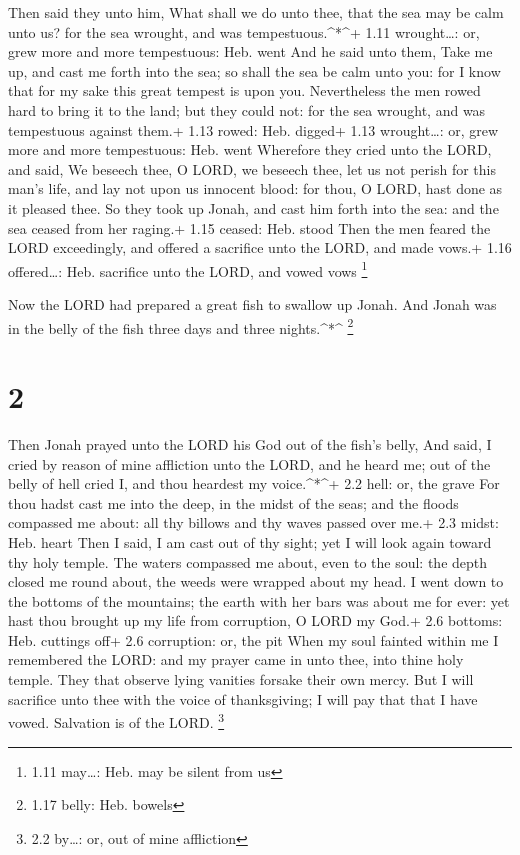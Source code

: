  Then said they unto him, What shall we do unto thee, that
the sea may be calm unto us? for the sea wrought, and was
tempestuous.\^{}*\^{}+ 1.11 wrought\ldots: or, grew more and more
tempestuous: Heb. went  And he said unto them, Take me up,
and cast me forth into the sea; so shall the sea be calm unto you: for I
know that for my sake this great tempest is upon you. 
Nevertheless the men rowed hard to bring it to the land; but they could
not: for the sea wrought, and was tempestuous against them.+ 1.13 rowed:
Heb. digged+ 1.13 wrought\ldots: or, grew more and more tempestuous:
Heb. went  Wherefore they cried unto the LORD, and said, We
beseech thee, O LORD, we beseech thee, let us not perish for this man's
life, and lay not upon us innocent blood: for thou, O LORD, hast done as
it pleased thee.  So they took up Jonah, and cast him forth
into the sea: and the sea ceased from her raging.+ 1.15 ceased: Heb.
stood  Then the men feared the LORD exceedingly, and
offered a sacrifice unto the LORD, and made vows.+ 1.16 offered\ldots:
Heb. sacrifice unto the LORD, and vowed vows \footnote{1.11 may\ldots:
  Heb. may be silent from us}

 Now the LORD had prepared a great fish to swallow up
Jonah. And Jonah was in the belly of the fish three days and three
nights.\^{}*\^{} \footnote{1.17 belly: Heb. bowels}

\hypertarget{section-1}{%
\section{2}\label{section-1}}

 Then Jonah prayed unto the LORD his God out of the fish's
belly,  And said, I cried by reason of mine affliction unto
the LORD, and he heard me; out of the belly of hell cried I, and thou
heardest my voice.\^{}*\^{}+ 2.2 hell: or, the grave  For
thou hadst cast me into the deep, in the midst of the seas; and the
floods compassed me about: all thy billows and thy waves passed over
me.+ 2.3 midst: Heb. heart  Then I said, I am cast out of
thy sight; yet I will look again toward thy holy temple. 
The waters compassed me about, even to the soul: the depth closed me
round about, the weeds were wrapped about my head.  I went
down to the bottoms of the mountains; the earth with her bars was about
me for ever: yet hast thou brought up my life from corruption, O LORD my
God.+ 2.6 bottoms: Heb. cuttings off+ 2.6 corruption: or, the pit
 When my soul fainted within me I remembered the LORD: and
my prayer came in unto thee, into thine holy temple.  They
that observe lying vanities forsake their own mercy.  But I
will sacrifice unto thee with the voice of thanksgiving; I will pay that
that I have vowed. Salvation is of the LORD. \footnote{2.2 by\ldots: or,
  out of mine affliction}

